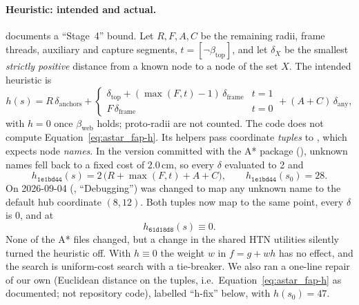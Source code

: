 \paragraph{Heuristic: intended and actual.}
 documents a ``Stage~4'' bound. Let $R, F, A, C$ be the remaining radii, frame
threads, auxiliary and capture segments, $t=[\neg\beta_{\mathrm{top}}]$, and let $\delta_X$ be the
smallest \emph{strictly positive} distance from a known node to a node of the set $X$. The
intended heuristic is
\begin{equation}
  h(s) = R\,\delta_{\mathrm{anchors}}
  + \begin{cases}
      \delta_{\mathrm{top}} + (\max(F,t)-1)\,\delta_{\mathrm{frame}} & t=1\\
      F\,\delta_{\mathrm{frame}} & t=0
    \end{cases}
  + (A + C)\,\delta_{\mathrm{any}} ,
  \label{eq:astar_fap-h}
\end{equation}
with $h=0$ once $\beta_{\mathrm{web}}$ holds; proto-radii are not counted. The code does not
compute Equation~\eqref{eq:astar_fap-h}. Its helpers pass coordinate \emph{tuples} to
, which expects node \emph{names}. In the version
committed with the A* package (), unknown names fell back to a fixed cost of
2.0\,cm, so every $\delta$ evaluated to 2 and
\begin{equation}
  h_{\mathtt{1e1bd44}}(s) = 2\,\bigl(R + \max(F,t) + A + C\bigr),\qquad h_{\mathtt{1e1bd44}}(s_0)=28 .
  \label{eq:astar_fap-h-old}
\end{equation}
On 2026-09-04 (, ``Debugging'')  was changed to map any
unknown name to the default hub coordinate $(8,12)$. Both tuples now map to the same point, every
$\delta$ is 0, and at 
\begin{equation}
  h_{\mathtt{61d18d8}}(s) \equiv 0 .
  \label{eq:astar_fap-h-head}
\end{equation}
None of the A* files changed, but a change in the shared HTN utilities silently turned the
heuristic off. With $h\equiv 0$ the weight $w$ in $f=g+wh$ has no effect, and the search is
uniform-cost search with a tie-breaker. We also ran a one-line repair of our own (Euclidean
distance on the tuples, i.e.\ Equation~\eqref{eq:astar_fap-h} as documented; not repository
code), labelled ``h-fix'' below, with $h(s_0)=47$.

